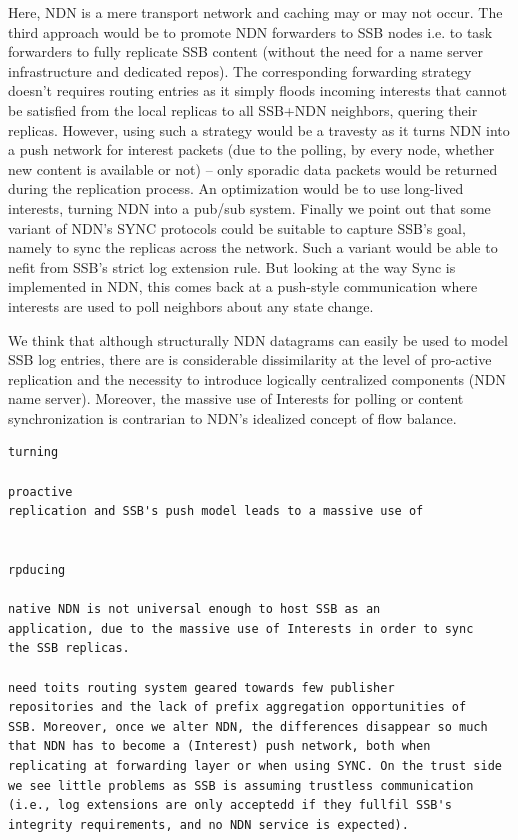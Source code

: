 \documentclass[sigconf]{acmart}
\begin{document}
Here, NDN is a mere transport network and caching
may or may not occur. The third approach would be to promote NDN
forwarders to SSB nodes i.e. to task forwarders to fully replicate SSB
content (without the need for a name server infrastructure and
dedicated repos). The corresponding forwarding strategy doesn't
requires routing entries as it simply floods incoming interests that
cannot be satisfied from the local replicas to all SSB+NDN neighbors,
quering their replicas. However, using such a strategy would be a
travesty as it turns NDN into a push network for interest packets (due
to the polling, by every node, whether new content is available or
not) -- only sporadic data packets would be returned during the
replication process. An optimization would be to use long-lived
interests, turning NDN into a pub/sub system. Finally we point out
that some variant of NDN's SYNC protocols could be suitable to capture
SSB's goal, namely to sync the replicas across the network. Such a
variant would be able to nefit from SSB's strict log extension
rule. But looking at the way Sync is implemented in NDN, this comes
back at a push-style communication where interests are used to poll
neighbors about any state change.

We think that although structurally NDN datagrams can easily be used
to model SSB log entries, there are is considerable dissimilarity at
the level of pro-active replication and the necessity to introduce
logically centralized components (NDN name server). Moreover, the
massive use of Interests for polling or content synchronization
is contrarian to NDN's idealized concept of flow balance.


\begin{verbatim}
turning

proactive
replication and SSB's push model leads to a massive use of


rpducing

native NDN is not universal enough to host SSB as an
application, due to the massive use of Interests in order to sync
the SSB replicas.

need toits routing system geared towards few publisher
repositories and the lack of prefix aggregation opportunities of
SSB. Moreover, once we alter NDN, the differences disappear so much
that NDN has to become a (Interest) push network, both when
replicating at forwarding layer or when using SYNC. On the trust side
we see little problems as SSB is assuming trustless communication
(i.e., log extensions are only acceptedd if they fullfil SSB's
integrity requirements, and no NDN service is expected).
\end{verbatim}
\end{document}
